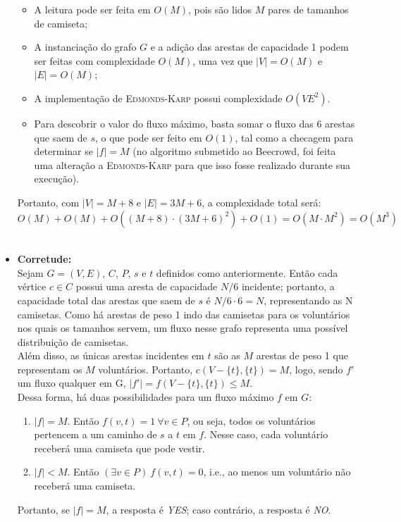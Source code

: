 \documentclass[
    12pt,
    a4paper,
    brazil,
    english
]{article}
\begin{document}
\begin{itemize}
    \begin{itemize}
        \item A leitura pode ser feita em $O(M)$, pois são lidos $M$ pares de tamanhos de camiseta;
        \item A instanciação do grafo $G$ e a adição das arestas de capacidade 1 podem ser feitas com complexidade $O(M)$, uma vez que $|V| = O(M)$ e $|E| = O(M)$;
        \item A implementação de \textsc{Edmonds-Karp} possui complexidade $O(VE^2)$.
        \item Para descobrir o valor do fluxo máximo, basta somar o fluxo das 6 arestas que saem de $s$, o que pode ser feito em $O(1)$, tal como a checagem para determinar se $|f| = M$ (no algoritmo submetido ao Beecrowd, foi feita uma alteração a \textsc{Edmonds-Karp} para que isso fosse realizado durante sua execução).
    \end{itemize}
    Portanto, com $|V| = M + 8$ e $|E| = 3M + 6$, a complexidade total será:
    $$O(M) + O(M) + O((M + 8)\cdot(3M+6)^2) + O(1) = O(M \cdot M^2) = O(M^3)$$ \\
    \item \textbf{Corretude:} \\
    Sejam $G = (V, E)$, $C$, $P$, $s$ e $t$ definidos como anteriormente.
    Então cada vértice $c \in C$ possui uma aresta de capacidade $N/6$ incidente; portanto, a capacidade total das arestas que saem de $s$ é \mbox{$N/6 \cdot 6 = N$}, representando as N camisetas. Como há arestas de peso 1 indo das camisetas para os voluntários nos quais os tamanhos servem, um fluxo nesse grafo representa uma possível distribuição de camisetas. \\
    Além disso, as únicas arestas incidentes em $t$ são as $M$ arestas de peso 1 que representam os $M$ voluntários. Portanto, \mbox{$c(V - \{t\}, \{t\}) = M$}, logo, sendo $f'$ um fluxo qualquer em G, $|f'| = f(V - \{t\}, \{t\}) \le M$. \\
    Dessa forma, há duas possibilidades para um fluxo máximo $f$ em $G$:
    \begin{enumerate}
        \item $|f| = M$. Então \mbox{$f(v, t) = 1 \ \forall v \in P$}, ou seja, todos os voluntários pertencem a um caminho de $s$ a $t$ em $f$. Nesse caso, cada voluntário receberá uma camiseta que pode vestir.
        \item $|f| < M$. Então \mbox{$(\exists v \in P) \ f(v, t) = 0$}, i.e., ao menos um voluntário não receberá uma camiseta.
    \end{enumerate}
    Portanto, se $|f| = M$, a resposta é \textit{YES}; caso contrário, a resposta é \textit{NO}.

\end{itemize}
\end{document}
